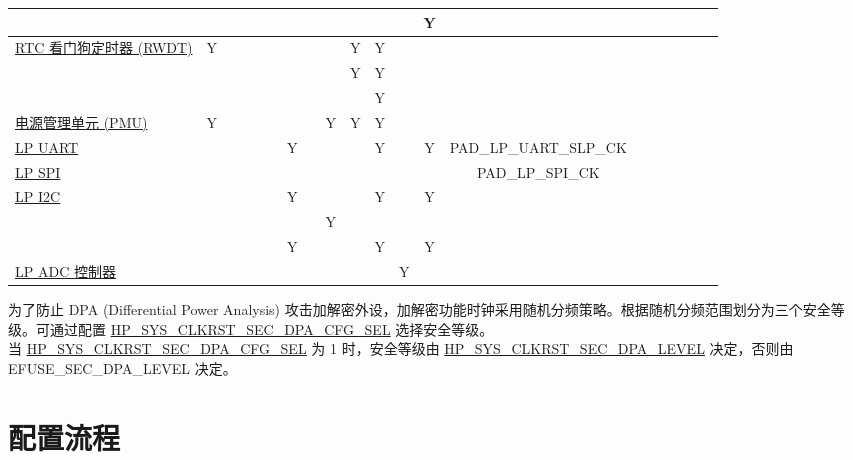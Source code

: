 \documentclass[main\_\_CN.tex]{subfiles}
\begin{document}
\begin{landscape}
\begin{tiny}
\begin{longtable}[c]{|m{2.1cm}|c|c|c|c|c|c|c|c|c|c|c|c|c|c|c|c|c|c|c| }
    \nameref{mod:efuse} &   &   &   &   &   &   &   &   &   &   &   & Y &  \\ \hline
    \hyperref[mod:wdt]{RTC 看门狗定时器 (RWDT)} & Y &   &   &   &   &   &   &   & Y & Y &   &   &   \\ \hline
    \nameref{mod:rtctimer} &   &   &   &   &   &   &   &   & Y & Y &   &   &   \\ \hline
    \nameref{mod:brownout} &   &   &   &   &   &   &   &   &   & Y &   &   &  \\ \hline
    \hyperref[mod:lowpowm]{电源管理单元 (PMU)} & Y &   &   &   &   &   &   & Y & Y & Y &   &   &  \\ \hline
    \hyperref[mod:uart]{LP UART} &   &   &   &   &   & Y &   &   &   & Y &   & Y & PAD\_LP\_UART\_SLP\_CK \\ \hline
    \hyperref[mod:spi]{LP SPI} &   &   &   &   &   &   &   &   &   &   &   &   & PAD\_LP\_SPI\_CK \\ \hline
    \hyperref[mod:i2c]{LP I2C} &   &   &   &   &   & Y &   &   &   & Y &   & Y &  \\ \hline
    \nameref{mod:anai2c} &   &   &   &   &   &   &   & Y &   &   &   &   &  \\ \hline
    \nameref{mod:lpi2s} &   &   &   &   &   & Y &   &   &   & Y &   & Y &  \\ \hline
    \hyperref[mod:adc]{LP ADC 控制器} &   &   &   &   &   &   &   &   &   &   & Y &   &  \\ \hline
\end{longtable}
\end{tiny}
\end{landscape}


\begin{tiplisting}
为了防止 DPA (Differential Power Analysis) 攻击加解密外设，加解密功能时钟采用随机分频策略。根据随机分频范围划分为三个安全等级。可通过配置 \hyperref[fielddesc:HPSYSCLKRSTSECDPACFGSEL]{HP\_SYS\_CLKRST\_SEC\_DPA\_CFG\_SEL} 选择安全等级。\\当 \hyperref[fielddesc:HPSYSCLKRSTSECDPACFGSEL]{HP\_SYS\_CLKRST\_SEC\_DPA\_CFG\_SEL} 为 1 时，安全等级由 \hyperref[fielddesc:HPSYSCLKRSTSECDPALEVEL]{HP\_SYS\_CLKRST\_SEC\_DPA\_LEVEL} 决定，否则由 \\EFUSE\_SEC\_DPA\_LEVEL 决定。
\end{tiplisting}

\section{配置流程}
\label{sec:resclk-prog-procedures}
\end{document}
